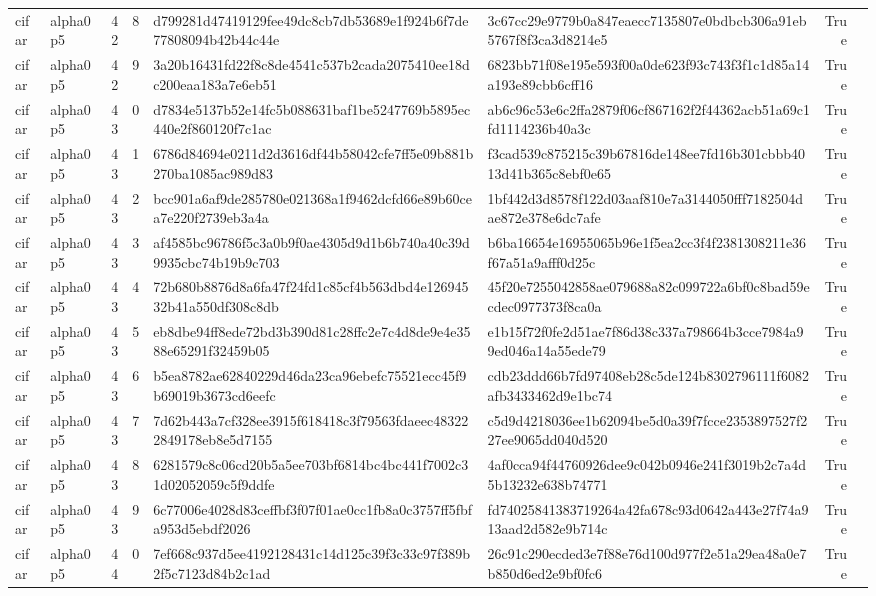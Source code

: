 \begin{tabular}{llrrllrl}
cifar & alpha0p5 & 42 & 8 & d799281d47419129fee49dc8cb7db53689e1f924b6f7de77808094b42b44c44e & 3c67cc29e9779b0a847eaecc7135807e0bdbcb306a91eb5767f8f3ca3d8214e5 & True &  \\
cifar & alpha0p5 & 42 & 9 & 3a20b16431fd22f8c8de4541c537b2cada2075410ee18dc200eaa183a7e6eb51 & 6823bb71f08e195e593f00a0de623f93c743f3f1c1d85a14a193e89cbb6cff16 & True &  \\
cifar & alpha0p5 & 43 & 0 & d7834e5137b52e14fc5b088631baf1be5247769b5895ec440e2f860120f7c1ac & ab6c96c53e6c2ffa2879f06cf867162f2f44362acb51a69c1fd1114236b40a3c & True &  \\
cifar & alpha0p5 & 43 & 1 & 6786d84694e0211d2d3616df44b58042cfe7ff5e09b881b270ba1085ac989d83 & f3cad539c875215c39b67816de148ee7fd16b301cbbb4013d41b365c8ebf0e65 & True &  \\
cifar & alpha0p5 & 43 & 2 & bcc901a6af9de285780e021368a1f9462dcfd66e89b60cea7e220f2739eb3a4a & 1bf442d3d8578f122d03aaf810e7a3144050fff7182504dae872e378e6dc7afe & True &  \\
cifar & alpha0p5 & 43 & 3 & af4585bc96786f5c3a0b9f0ae4305d9d1b6b740a40c39d9935cbc74b19b9c703 & b6ba16654e16955065b96e1f5ea2cc3f4f2381308211e36f67a51a9afff0d25c & True &  \\
cifar & alpha0p5 & 43 & 4 & 72b680b8876d8a6fa47f24fd1c85cf4b563dbd4e12694532b41a550df308c8db & 45f20e7255042858ae079688a82c099722a6bf0c8bad59ecdec0977373f8ca0a & True &  \\
cifar & alpha0p5 & 43 & 5 & eb8dbe94ff8ede72bd3b390d81c28ffc2e7c4d8de9e4e3588e65291f32459b05 & e1b15f72f0fe2d51ae7f86d38c337a798664b3cce7984a99ed046a14a55ede79 & True &  \\
cifar & alpha0p5 & 43 & 6 & b5ea8782ae62840229d46da23ca96ebefc75521ecc45f9b69019b3673cd6eefc & cdb23ddd66b7fd97408eb28c5de124b8302796111f6082afb3433462d9e1bc74 & True &  \\
cifar & alpha0p5 & 43 & 7 & 7d62b443a7cf328ee3915f618418c3f79563fdaeec483222849178eb8e5d7155 & c5d9d4218036ee1b62094be5d0a39f7fcce2353897527f227ee9065dd040d520 & True &  \\
cifar & alpha0p5 & 43 & 8 & 6281579c8c06cd20b5a5ee703bf6814bc4bc441f7002c31d02052059c5f9ddfe & 4af0cca94f44760926dee9c042b0946e241f3019b2c7a4d5b13232e638b74771 & True &  \\
cifar & alpha0p5 & 43 & 9 & 6c77006e4028d83ceffbf3f07f01ae0cc1fb8a0c3757ff5fbfa953d5ebdf2026 & fd74025841383719264a42fa678c93d0642a443e27f74a913aad2d582e9b714c & True &  \\
cifar & alpha0p5 & 44 & 0 & 7ef668c937d5ee4192128431c14d125c39f3c33c97f389b2f5c7123d84b2c1ad & 26c91c290ecded3e7f88e76d100d977f2e51a29ea48a0e7b850d6ed2e9bf0fc6 & True &  \\

\end{tabular}
